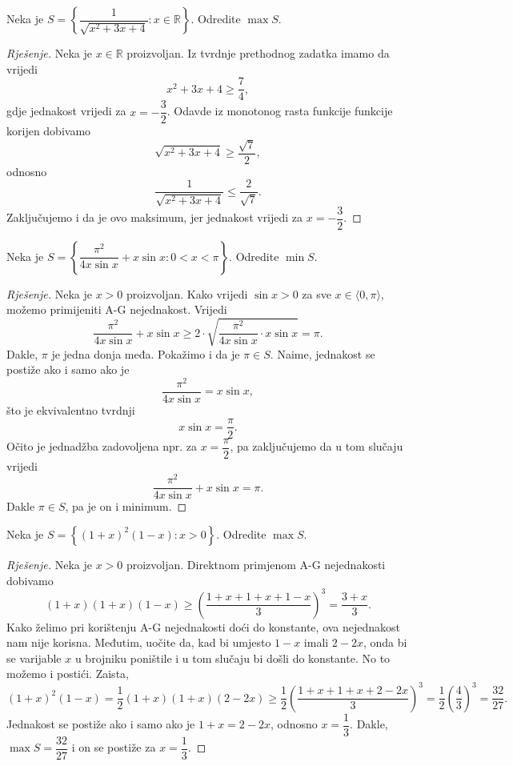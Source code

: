 \begin{exercise}
Neka je $S=\left\{\dfrac{1}{\sqrt{x^2+3x+4}} : x\in \mathbb{R}\right\}$. Odredite $\max{S}$.
\end{exercise}
\begin{proof}[Rješenje]
Neka je $x\in \mathbb{R}$ proizvoljan. Iz tvrdnje prethodnog zadatka imamo da vrijedi $$x^2+3x+4\geq \dfrac{7}{4},$$
gdje jednakost vrijedi za $x=-\dfrac{3}{2}$. Odavde iz monotonog rasta funkcije funkcije korijen dobivamo $$\sqrt{x^2+3x+4}\geq \dfrac{\sqrt{7}}{2},$$
odnosno
$$\dfrac{1}{\sqrt{x^2+3x+4}}\leq \dfrac{2}{\sqrt{7}}.$$ Zaključujemo i da je ovo maksimum, jer jednakost vrijedi za $x=-\dfrac{3}{2}$.
\end{proof}
\begin{exercise}
Neka je $S=\left\{\dfrac{\pi^2}{4x\sin{x}}+x\sin{x} : 0<x<\pi\right\}$. Odredite $\min{S}$.
\end{exercise}
\begin{proof}[Rješenje]
Neka je $x>0$ proizvoljan. Kako vrijedi $\sin{x}>0$ za sve $x\in \langle 0, \pi\rangle$, možemo primijeniti A-G nejednakost. Vrijedi
$$\dfrac{\pi^2}{4x\sin{x}}+x\sin{x}\geq 2\cdot \sqrt{\dfrac{\pi^2}{4x\sin{x}}\cdot x\sin{x}}=\pi.$$
Dakle, $\pi$ je jedna donja međa. Pokažimo i da je $\pi\in S$. Naime, jednakost se postiže ako i samo ako je $$\dfrac{\pi^2}{4x\sin{x}}=x\sin{x},$$ što je ekvivalentno tvrdnji $$x\sin{x}=\dfrac{\pi}{2}.$$ Očito je jednadžba zadovoljena npr. za $x=\dfrac{\pi}{2}$, pa zaključujemo da u tom slučaju vrijedi $$\dfrac{\pi^2}{4x\sin{x}}+x\sin{x}=\pi.$$ Dakle $\pi\in S$, pa je on i minimum.
\end{proof}
\begin{exercise}
Neka je $S=\left\{(1+x)^2(1-x) : x>0\right\}$. Odredite $\max{S}$.
\end{exercise}
\begin{proof}[Rješenje]
Neka je $x>0$ proizvoljan. Direktnom primjenom A-G nejednakosti dobivamo $$(1+x)(1+x)(1-x)\geq \left(\dfrac{1+x+1+x+1-x}{3}\right)^3=\dfrac{3+x}{3}.$$ Kako želimo pri korištenju A-G nejednakosti doći do konstante, ova nejednakost nam nije korisna. Međutim, uočite da, kad bi umjesto $1-x$ imali $2-2x$, onda bi se varijable $x$ u brojniku poništile i u tom slučaju bi došli do konstante. No to možemo i postići. Zaista,
$$(1+x)^2(1-x)=\dfrac{1}{2}(1+x)(1+x)(2-2x)\geq \dfrac{1}{2}\left(\dfrac{1+x+1+x+2-2x}{3}\right)^3=\dfrac{1}{2}\left(\dfrac{4}{3}\right)^3=\dfrac{32}{27}.$$
Jednakost se postiže ako i samo ako je $1+x=2-2x$, odnosno $x=\dfrac{1}{3}$. Dakle, $\max{S}=\dfrac{32}{27}$ i on se postiže za $x=\dfrac{1}{3}$.
\end{proof}
